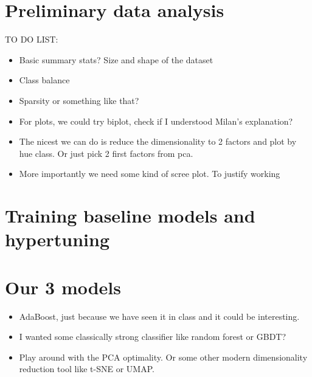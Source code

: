\documentclass{article}
\begin{document}
\section{Preliminary data analysis}

TO DO LIST:
\begin{itemize}
    \item Basic summary stats? Size and shape of the dataset
    \item Class balance
    \item Sparsity or something like that?
    \item For plots, we could try biplot, check if I understood Milan's explanation?
    \item The nicest we can do is reduce the dimensionality to 2 factors and plot by hue class. 
    Or just pick 2 first factors from pca.
    \item More importantly we need some kind of scree plot. To justify working
\end{itemize}


\section{Training baseline models and hypertuning}

\section{Our 3 models}

\begin{itemize}
    \item AdaBoost, just because we have seen it in class and it could be interesting.
    \item I wanted some classically strong classifier like random forest or GBDT?
    \item Play around with the PCA optimality. Or some other modern dimensionality reduction tool like t-SNE or UMAP. 
\end{itemize}

\section{}
\end{document}
